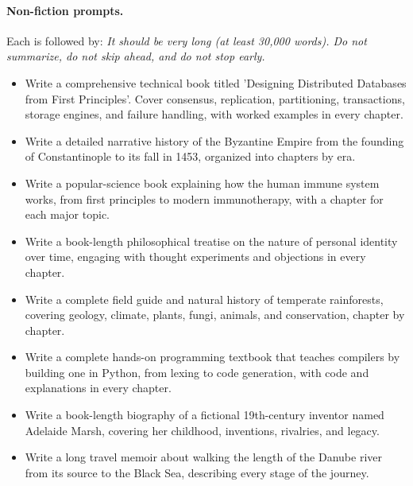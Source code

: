 \paragraph{Non-fiction prompts.} Each is followed by: \emph{It should be very long (at least 30,000 words). Do not summarize, do not skip ahead, and do not stop early.}
\begin{itemize}[leftmargin=*,nosep]
\item Write a comprehensive technical book titled 'Designing Distributed Databases from First Principles'. Cover consensus, replication, partitioning, transactions, storage engines, and failure handling, with worked examples in every chapter.
\item Write a detailed narrative history of the Byzantine Empire from the founding of Constantinople to its fall in 1453, organized into chapters by era.
\item Write a popular-science book explaining how the human immune system works, from first principles to modern immunotherapy, with a chapter for each major topic.
\item Write a book-length philosophical treatise on the nature of personal identity over time, engaging with thought experiments and objections in every chapter.
\item Write a complete field guide and natural history of temperate rainforests, covering geology, climate, plants, fungi, animals, and conservation, chapter by chapter.
\item Write a complete hands-on programming textbook that teaches compilers by building one in Python, from lexing to code generation, with code and explanations in every chapter.
\item Write a book-length biography of a fictional 19th-century inventor named Adelaide Marsh, covering her childhood, inventions, rivalries, and legacy.
\item Write a long travel memoir about walking the length of the Danube river from its source to the Black Sea, describing every stage of the journey.
\end{itemize}
